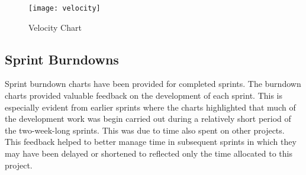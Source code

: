   \begin{figure}[H]
    \setlength{\belowcaptionskip}{15pt plus 3pt minus 2pt}
    \caption{Velocity Chart}
    \centering
    \texttt{[image: velocity]}
    \label{fig:velocity}
  \end{figure}

	\subsection{Sprint Burndowns}
  Sprint burndown charts have been provided for completed sprints. The burndown charts provided valuable feedback on the development of each sprint. This is especially evident from earlier sprints where the charts highlighted that much of the development work was begin carried out during a relatively short period of the two-week-long sprints. This was due to time also spent on other projects. This feedback helped to better manage time in subsequent sprints in which they may have been delayed or shortened to reflected only the time allocated to this project.